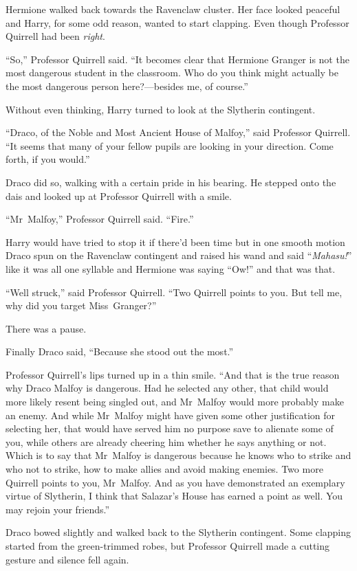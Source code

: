 Hermione walked back towards the Ravenclaw cluster. Her face looked peaceful and Harry, for some odd reason, wanted to start clapping. Even though Professor Quirrell had been \emph{right}.

“So,” Professor Quirrell said. “It becomes clear that Hermione Granger is not the most dangerous student in the classroom. Who do you think might actually be the most dangerous person here?—besides me, of course.”

Without even thinking, Harry turned to look at the Slytherin contingent.

“Draco, of the Noble and Most Ancient House of Malfoy,” said Professor Quirrell. “It seems that many of your fellow pupils are looking in your direction. Come forth, if you would.”

Draco did so, walking with a certain pride in his bearing. He stepped onto the dais and looked up at Professor Quirrell with a smile.

“Mr~Malfoy,” Professor Quirrell said. “Fire.”

Harry would have tried to stop it if there’d been time but in one smooth motion Draco spun on the Ravenclaw contingent and raised his wand and said “\emph{Mahasu!}” like it was all one syllable and Hermione was saying “Ow!” and that was that.

“Well struck,” said Professor Quirrell. “Two Quirrell points to you. But tell me, why did you target Miss~Granger?”

There was a pause.

Finally Draco said, “Because she stood out the most.”

Professor Quirrell’s lips turned up in a thin smile. “And that is the true reason why Draco Malfoy is dangerous. Had he selected any other, that child would more likely resent being singled out, and Mr~Malfoy would more probably make an enemy. And while Mr~Malfoy might have given some other justification for selecting her, that would have served him no purpose save to alienate some of you, while others are already cheering him whether he says anything or not. Which is to say that Mr~Malfoy is dangerous because he knows who to strike and who not to strike, how to make allies and avoid making enemies. Two more Quirrell points to you, Mr~Malfoy. And as you have demonstrated an exemplary virtue of Slytherin, I think that Salazar’s House has earned a point as well. You may rejoin your friends.”

Draco bowed slightly and walked back to the Slytherin contingent. Some clapping started from the green-trimmed robes, but Professor Quirrell made a cutting gesture and silence fell again.

